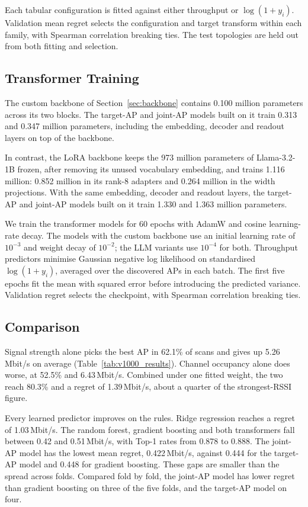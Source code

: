 \documentclass[conference]{IEEEtran}
\begin{document}
Each tabular configuration is fitted against either throughput or
$\log(1+y_i)$. Validation mean regret selects the configuration and target
transform within each family, with Spearman correlation breaking ties. The
test topologies are held out from both fitting and selection.

\subsection{Transformer Training}

The custom backbone of Section~\ref{sec:backbone} contains 0.100 million
parameters across its two blocks. The target-AP and joint-AP models built on it
train 0.313 and 0.347 million parameters, including the embedding, decoder and
readout layers on top of the backbone.

In contrast, the LoRA backbone keeps the 973 million parameters of
Llama-3.2-1B frozen, after removing its unused vocabulary embedding, and trains
1.116 million: 0.852 million in its rank-8 adapters and 0.264 million in the
width projections. With the same embedding, decoder and readout layers, the
target-AP and joint-AP models built on it train 1.330 and 1.363 million
parameters.

We train the transformer models for 60 epochs with AdamW and cosine
learning-rate decay. The models with the custom backbone use an initial
learning rate of $10^{-3}$ and weight decay of $10^{-2}$; the LLM variants use $10^{-4}$ for
both. Throughput predictors minimise Gaussian negative log likelihood on
standardised $\log(1+y_i)$, averaged over the discovered APs in each batch.
The first five epochs fit the mean with squared error before introducing
the predicted variance. Validation regret selects the checkpoint,
with Spearman correlation breaking ties.

\subsection{Comparison}

Signal strength alone picks the best AP in 62.1\% of scans and gives up
5.26\,Mbit/s on average (Table~\ref{tab:v1000_results}). Channel occupancy
alone does worse, at 52.5\% and 6.43\,Mbit/s. Combined under one fitted
weight, the two reach 80.3\% and a regret of 1.39\,Mbit/s, about a quarter of
the strongest-RSSI figure.

Every learned predictor improves on the rules. Ridge regression reaches a
regret of 1.03\,Mbit/s. The random forest, gradient boosting and both
transformers fall between 0.42 and 0.51\,Mbit/s, with Top-1 rates from 0.878
to 0.888. The joint-AP model has the lowest mean regret, 0.422\,Mbit/s,
against 0.444 for the target-AP model and 0.448 for gradient boosting. These
gaps are smaller than the spread across folds. Compared fold by fold, the
joint-AP model has lower regret than gradient boosting on three of the five
folds, and the target-AP model on four.
\end{document}
